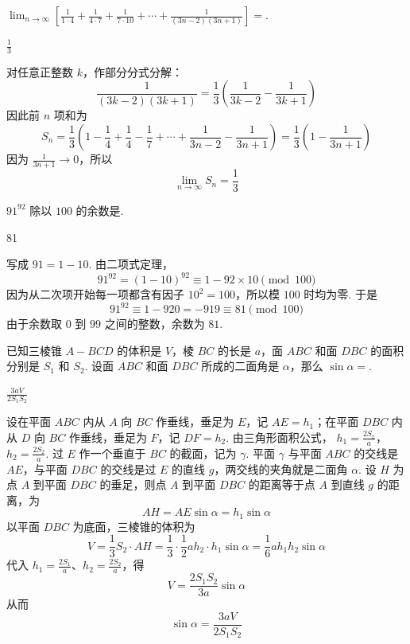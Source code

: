 \begin{problem}
\(\displaystyle\lim_{n\to\infty}\left[ \frac{1}{1\cdot 4}+\frac{1}{4\cdot 7}+\frac{1}{7\cdot 10}+\cdots+\frac{1}{(3n-2)(3n+1)} \right]=\)\fillinblank{}.
\end{problem}

\begin{answer}
\(\frac13\)
\end{answer}

\begin{solution}
对任意正整数 \(k\)，作部分分式分解：
\[
\frac{1}{(3k-2)(3k+1)}=\frac13\left(\frac{1}{3k-2}-\frac{1}{3k+1}\right)
\]
因此前 \(n\) 项和为
\[
S_n=\frac13\left(1-\frac14+\frac14-\frac17+\cdots+\frac{1}{3n-2}-\frac{1}{3n+1}\right)=\frac13\left(1-\frac{1}{3n+1}\right)
\]
因为 \(\frac{1}{3n+1}\to0\)，所以
\[
\lim_{n\to\infty}S_n=\frac13
\]
\end{solution}

\begin{problem}
\(91^{92}\) 除以 \(100\) 的余数是\fillinblank{}.
\end{problem}

\begin{answer}
81
\end{answer}

\begin{solution}
写成 \(91=1-10\). 由二项式定理，
\[
91^{92}=(1-10)^{92}\equiv1-92\times10\pmod {100}
\]
因为从二次项开始每一项都含有因子 \(10^2=100\)，所以模 \(100\) 时均为零. 于是
\[
91^{92}\equiv1-920=-919\equiv81\pmod {100}
\]
由于余数取 \(0\) 到 \(99\) 之间的整数，余数为 \(81\).
\end{solution}

\begin{problem}
已知三棱锥 \(A-BCD\) 的体积是 \(V\)，棱 \(BC\) 的长是 \(a\)，面 \(ABC\) 和面 \(DBC\) 的面积分别是 \(S_1\) 和 \(S_2\). 设面 \(ABC\) 和面 \(DBC\) 所成的二面角是 \(\alpha\)，那么 \(\sin \alpha=\)\fillinblank{}.
\end{problem}

\begin{answer}
\(\frac{3aV}{2S_1S_2}\)
\end{answer}

\begin{solution}
设在平面 \(ABC\) 内从 \(A\) 向 \(BC\) 作垂线，垂足为 \(E\)，记 \(AE=h_1\)；在平面 \(DBC\) 内从 \(D\) 向 \(BC\) 作垂线，垂足为 \(F\)，记 \(DF=h_2\). 由三角形面积公式，
\(h_1=\frac{2S_1}{a}\)，\(h_2=\frac{2S_2}{a}\).
过 \(E\) 作一个垂直于 \(BC\) 的截面，记为 \(\gamma\). 平面 \(\gamma\) 与平面 \(ABC\) 的交线是 \(AE\)，与平面 \(DBC\) 的交线是过 \(E\) 的直线 \(g\)，两交线的夹角就是二面角 \(\alpha\). 设 \(H\) 为点 \(A\) 到平面 \(DBC\) 的垂足，则点 \(A\) 到平面 \(DBC\) 的距离等于点 \(A\) 到直线 \(g\) 的距离，为
\[
AH=AE\sin\alpha=h_1\sin\alpha
\]
以平面 \(DBC\) 为底面，三棱锥的体积为
\[
V=\frac13S_2\cdot AH=\frac13\cdot\frac12ah_2\cdot h_1\sin\alpha
=\frac16ah_1h_2\sin\alpha
\]
代入 \(h_1=\frac{2S_1}{a}\)、\(h_2=\frac{2S_2}{a}\)，得
\[
V=\frac{2S_1S_2}{3a}\sin\alpha
\]
从而
\[
\sin\alpha=\frac{3aV}{2S_1S_2}
\]
\end{solution}

